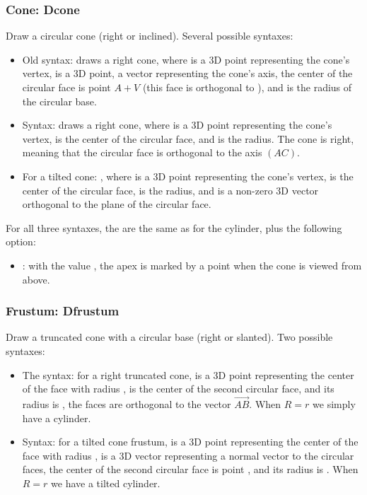 \subsubsection{Cone: Dcone}

Draw a circular cone (right or inclined). Several possible syntaxes:
\begin{itemize}
    \item Old syntax:  draws a right cone, where  is a 3D point representing the cone's vertex,  is a 3D point, a vector representing the cone's axis, the center of the circular face is point $A+V$ (this face is orthogonal to ), and  is the radius of the circular base.

    \item Syntax:  draws a right cone, where  is a 3D point representing the cone's vertex,  is the center of the circular face, and  is the radius. The cone is right, meaning that the circular face is orthogonal to the axis $(AC)$.

    \item For a tilted cone: , where  is a 3D point representing the cone's vertex,  is the center of the circular face,  is the radius, and  is a non-zero 3D vector orthogonal to the plane of the circular face.
\end{itemize}

For all three syntaxes, the  are the same as for the cylinder, plus the following option:
\begin{itemize}
\item {} : with the value \true, the apex is marked by a point when the cone is viewed from above.
\end{itemize}

\subsubsection{Frustum: Dfrustum}

Draw a truncated cone with a circular base (right or slanted). Two possible syntaxes:

\begin{itemize}
    \item The syntax:  for a right truncated cone,  is a 3D point representing the center of the face with radius ,  is the center of the second circular face, and its radius is , the faces are orthogonal to the vector $\vec{AB}$. When $R=r$ we simply have a cylinder.

    \item Syntax:  for a tilted cone frustum,  is a 3D point representing the center of the face with radius ,  is a 3D vector representing a normal vector to the circular faces, the center of the second circular face is point , and its radius is . When $R=r$ we have a tilted cylinder.
\end{itemize}

